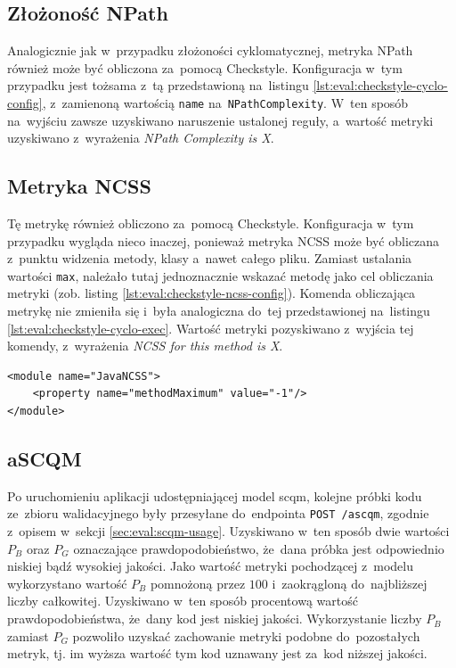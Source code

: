 \documentclass[twoside]{praca}
\begin{document}
\subsection{Złożoność NPath}
Analogicznie jak w~przypadku złożoności cyklomatycznej, metryka NPath również może być obliczona za~pomocą Checkstyle. Konfiguracja w~tym przypadku jest tożsama z~tą przedstawioną na~listingu \ref{lst:eval:checkstyle-cyclo-config}, z~zamienoną wartością \texttt{name} na~\texttt{NPathComplexity}. W~ten sposób na~wyjściu zawsze uzyskiwano naruszenie ustalonej reguły, a~wartość metryki uzyskiwano z~wyrażenia \textit{NPath Complexity is X}.

\subsection{Metryka NCSS}
Tę metrykę również obliczono za~pomocą Checkstyle. Konfiguracja w~tym przypadku wygląda nieco inaczej, ponieważ metryka NCSS może być obliczana z~punktu widzenia metody, klasy a~nawet całego pliku. Zamiast ustalania wartości \texttt{max}, należało tutaj jednoznacznie wskazać metodę jako cel obliczania metryki (zob. listing \ref{lst:eval:checkstyle-ncss-config}). Komenda obliczająca metrykę nie zmieniła się i~była analogiczna do~tej przedstawionej na~listingu \ref{lst:eval:checkstyle-cyclo-exec}. Wartość metryki pozyskiwano z~wyjścia tej komendy, z~wyrażenia \textit{NCSS for this method is X}.

\begin{lstlisting}[frame=single,caption={Konfiguracja Checkstyle dla obliczania metryki NCSS z~punktu widzenia metody klasy},captionpos=b,label={lst:eval:checkstyle-ncss-config}]
<module name="JavaNCSS">
    <property name="methodMaximum" value="-1"/>
</module>
\end{lstlisting}

\subsection{aSCQM}
Po uruchomieniu aplikacji udostępniającej model \gls{scqm}, kolejne próbki kodu ze~zbioru walidacyjnego były przesyłane do~endpointa \texttt{POST /ascqm}, zgodnie z~opisem w~sekcji \ref{sec:eval:scqm-usage}. Uzyskiwano w~ten sposób dwie wartości $P_B$ oraz $P_G$ oznaczające prawdopodobieństwo, że~dana próbka jest odpowiednio niskiej bądź wysokiej jakości. Jako wartość metryki pochodzącej z~modelu wykorzystano wartość $P_B$ pomnożoną przez $100$ i~zaokrągloną do~najbliższej liczby całkowitej. Uzyskiwano w~ten sposób procentową wartość prawdopodobieństwa, że~dany kod jest niskiej jakości. Wykorzystanie liczby $P_B$ zamiast $P_G$ pozwoliło uzyskać zachowanie metryki podobne do~pozostałych metryk, tj. im wyższa wartość tym kod uznawany jest za~kod niższej jakości.
\end{document}

